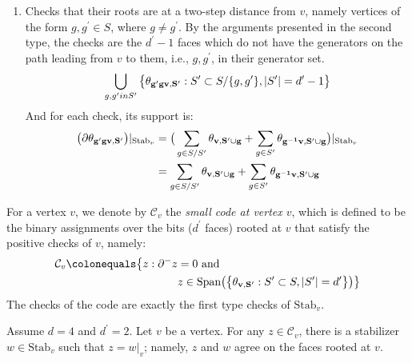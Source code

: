 \begin{enumerate}
  \item Checks that their roots are at a two-step distance from $v$, namely vertices of the form $g, g^{\prime} \in S$, where $g \neq g^{\prime}$. By the arguments presented in the second type, the checks are the $d^{\prime}-1$ faces which do not have the generators on the path leading from $v$ to them, i.e., $g, g^{\prime}$, in their generator set.
    \begin{equation*}
      \begin{split}
        \bigcup_{g,g^{\prime} in S^{\prime} }\big\{ \mathbf{\theta_{g^{\prime}gv ,S^{\prime}} }: S^{\prime} \subset S/\{ g, g^{\prime} \} , |S^{\prime}|=d^{\prime}-1  \big\}
      \end{split}
    \end{equation*}
  And for each check, its support is:
    \begin{equation*}
      \begin{split}
        \big( \partial \mathbf{\theta_{g^{\prime}gv ,S^{\prime}} }  \big)|_{\text{Stab}_{v}} & =  \big(    \sum_{g \in S/S^{\prime}} \mathbf{\theta_{v ,S^{\prime} \cup g} } + \sum_{g \in S^{\prime}} \mathbf{\theta_{g^{-1}v ,S^{\prime}\cup g} } \big)|_{\text{Stab}_{v}}\\
        &=    \sum_{g \in S/S^{\prime}} \mathbf{\theta_{v ,S^{\prime} \cup g} } + \sum_{g \in S^{\prime}} \mathbf{\theta_{g^{-1}v ,S^{\prime}\cup g} }   
      \end{split}
    \end{equation*}
\end{enumerate}

\begin{definition}
  For a vertex $v$, we denote by $\mathcal{C}_{v}$ the \textit{small code at vertex $v$}, which is defined to be the binary assignments over the bits ($d^{\prime}$ faces) rooted at $v$ that satisfy the positive checks of $v$, namely:   
  \begin{align*}
    \mathcal{C}_{v} \colonequals  \bigl\{ z : \partial^{-} z  &= 0 \text{ and } \\
    & z \in \text{Span} \big(  \big\{  \rotfvs{} : S^{\prime} \subset S, |S^{\prime}| = d^{\prime}  \big\} \big) \bigr\} 
  \end{align*}
The checks of the code are exactly the first type checks of $\text{Stab}_{v}$.
\end{definition}
\begin{claim}
  \label{claim:agreement}
  Assume $d=4$ and $d^{\prime}=2$. Let $v$ be a vertex. For any $z \in \mathcal{C}_{v}$, there is a stabilizer $w \in \text{Stab}_{v}$ such that $z = w|_{v}$; namely, $z$ and $w$ agree on the faces rooted at $v$.
\end{claim}

